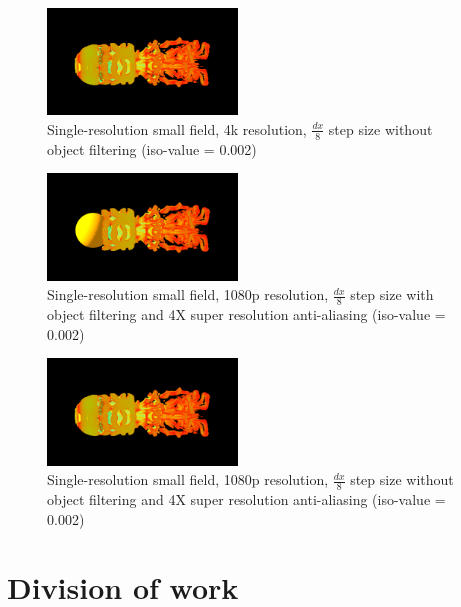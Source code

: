 \documentclass[acmtog]{acmart}
\begin{document}
    \begin{figure}[H]
        \centering
        \includegraphics[width=0.45\textwidth]{./image/single_small_4k_8_no_filter_0.002}
        \caption{Single-resolution small field, 4k resolution, $ \frac{dx}{8} $ step size without object filtering (iso-value = 0.002)}\label{fig:figure14}
    \end{figure}

    \begin{figure}[H]
        \centering
        \includegraphics[width=0.45\textwidth]{./image/single_small_1080p_8_filter_0.002_4XRES}
        \caption{Single-resolution small field, 1080p resolution, $ \frac{dx}{8} $ step size with object filtering and 4X super resolution anti-aliasing (iso-value = 0.002)}\label{fig:figure15}
    \end{figure}

    \begin{figure}[H]
        \centering
        \includegraphics[width=0.45\textwidth]{./image/single_small_1080p_8_no_filter_0.002_4XRES}
        \caption{Single-resolution small field, 1080p resolution, $ \frac{dx}{8} $ step size without object filtering and 4X super resolution anti-aliasing (iso-value = 0.002)}\label{fig:figure16}
    \end{figure}


    \section{Division of work}\label{sec:division-of-work}
\end{document}
